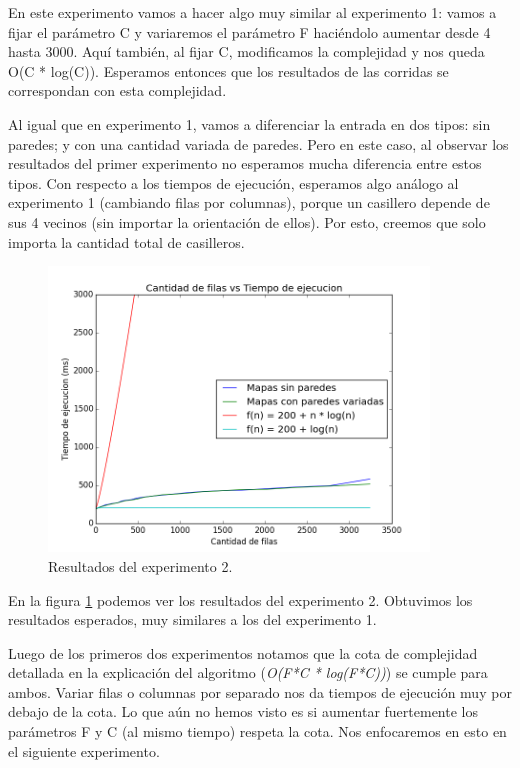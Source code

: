 \par En este experimento vamos a hacer algo muy similar al experimento 1: vamos a fijar el parámetro C y variaremos el parámetro F haciéndolo aumentar desde 4 hasta 3000. Aquí también, al fijar C, modificamos la complejidad y nos queda O(C * log(C)). Esperamos entonces que los resultados de las corridas se correspondan con esta complejidad.

\par Al igual que en experimento 1, vamos a diferenciar la entrada en dos tipos: sin paredes; y con una cantidad variada de paredes. Pero en este caso, al observar los resultados del primer experimento no esperamos mucha diferencia entre estos tipos. Con respecto a los tiempos de ejecución, esperamos algo análogo al experimento 1 (cambiando filas por columnas), porque un casillero depende de sus 4 vecinos (sin importar la orientación de ellos). Por esto, creemos que solo importa la cantidad total de casilleros.

\begin{figure}[H]
  \centering
  \includegraphics[width=0.9\textwidth]{Problema2/img/exp2_filas.png}
  \caption{Resultados del experimento 2.}
  \label{fig: ej2_exp2_filas}
\end{figure}

\par En la figura \ref{fig: ej2_exp2_filas} podemos ver los resultados del experimento 2. Obtuvimos los resultados esperados, muy similares a los del experimento 1.

\par Luego de los primeros dos experimentos notamos que la cota de complejidad detallada en la explicación del algoritmo (\textit{O(F*C * log(F*C))}) se cumple para ambos. Variar filas o columnas por separado nos da tiempos de ejecución muy por debajo de la cota. Lo que aún no hemos visto es si aumentar fuertemente los parámetros F y C (al mismo tiempo) respeta la cota. Nos enfocaremos en esto en el siguiente experimento.

